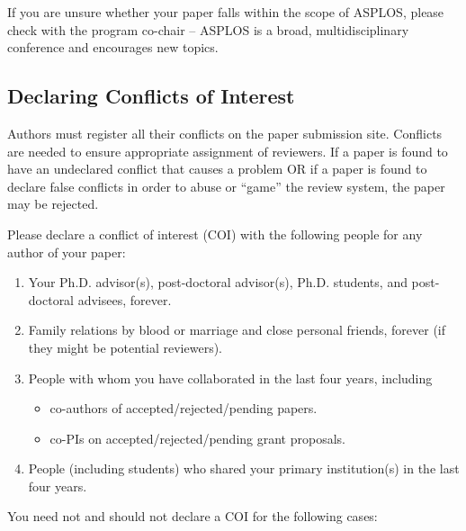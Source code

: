 \documentclass[pageno]{jpaper}
\begin{document}
If
you are unsure whether your paper falls within the scope of ASPLOS, please
check with the program co-chair -- ASPLOS is a broad, multidisciplinary
conference and encourages new topics.

\subsection{Declaring Conflicts of Interest}

Authors must register all their conflicts on the paper submission site.
Conflicts are needed to ensure appropriate assignment of reviewers.
If a paper is found to have an undeclared conflict that causes
a problem OR if a paper is found to declare false conflicts in order to
abuse or ``game'' the review system, the paper may be rejected.

Please declare a conflict of interest (COI) with the following people
for any author of your paper:

\begin{enumerate}
\item Your Ph.D. advisor(s), post-doctoral advisor(s), Ph.D. students,
      and post-doctoral advisees, forever.
\item Family relations by blood or marriage and close personal friends, forever (if they might be potential reviewers).
\item People with whom you have collaborated in the last four years, including
\begin{itemize}
\item co-authors of accepted/rejected/pending papers.
\item co-PIs on accepted/rejected/pending grant proposals.
\end{itemize}
\item People (including students) who shared your primary institution(s) in the
last four years.
\end{enumerate}

You need not and should not declare a COI for the following cases:
\end{document}
